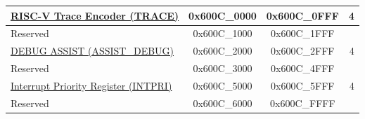 \begin{ThreePartTable}
\begin{longtable}[c]{ |p{7cm}|c|c|r| }
\hyperref[mod:riscvtracenc]{RISC-V Trace Encoder (TRACE)} & 0x600C\_0000 & 0x600C\_0FFF &   4     \\\hline
    \rowcolor{gray!25}  Reserved                    & 0x600C\_1000 & 0x600C\_1FFF &         \\\hline
\hyperref[mod:dbgassist]{DEBUG ASSIST  (ASSIST\_DEBUG)}\tnote{\textcolor{red}{*}}               & 0x600C\_2000 & 0x600C\_2FFF &   4     \\\hline
    \rowcolor{gray!25}  Reserved                    & 0x600C\_3000 & 0x600C\_4FFF &         \\\hline
\hyperref[mod:riscvcpu]{Interrupt Priority Register (INTPRI)}                 & 0x600C\_5000 & 0x600C\_5FFF &   4     \\\hline
    \rowcolor{gray!25}  Reserved                    & 0x600C\_6000 & 0x600C\_FFFF &         \\\hline

\end{longtable}
\end{ThreePartTable}

